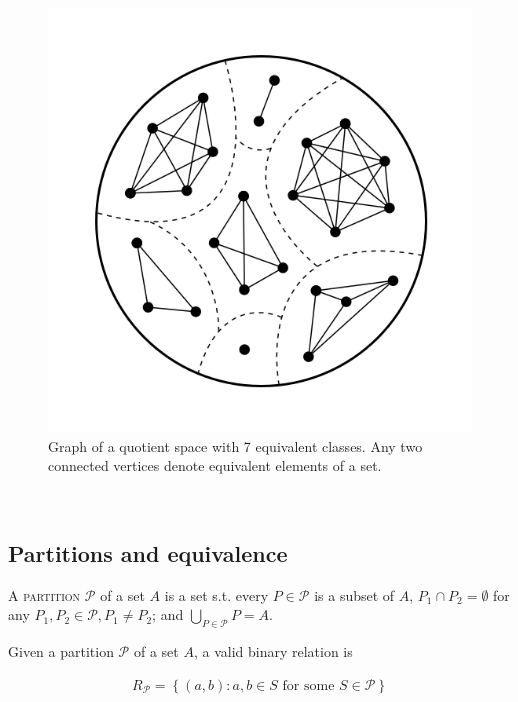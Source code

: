 \documentclass[a4paper, 12pt]{article}
\theoremstyle{definition}
\theoremstyle{definition}
\theoremstyle{definition}
\begin{document}
\begin{figure}
    \caption{Graph of a quotient space with 7 equivalent classes. Any two
    connected vertices denote equivalent elements of a set.}
\centering
\includegraphics[scale=0.5]{equiv}
\end{figure}
\pagebreak 
~ 

\subsection{Partitions and equivalence}

\lettrine{A}{  partition } $\mathcal{P}$ of a set $A$ is a set s.t. every $P \in \mathcal{P}$
is a subset of $A$, $P_1 \cap P_2 = \emptyset$ for any $P_1, P_2 \in
\mathcal{P}, P_1 \neq P_2$; and $\bigcup_{P \in \mathcal{P}} P = A$.

Given a partition $\mathcal{P}$ of a set $A$, a valid binary relation is 

\begin{align*}
    R_{\mathcal{P}} = \left\{ (a, b) : a, b \in  S \text{ for some } S \in
    \mathcal{P} \right\} 
\end{align*}
\end{document}
